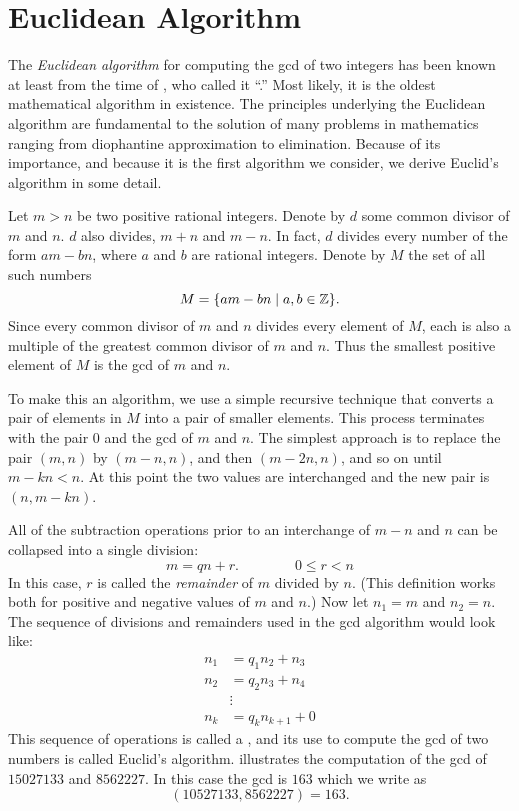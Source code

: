 \section{Euclidean Algorithm}
\label{Integer:Euclidean:Sec}

The {\em Euclidean algorithm} for computing the {\sc gcd} of two
integers has been known at least from the time of 
\cite{Fritz1945-sw}, who called it ``.''  Most
likely, it is the oldest mathematical algorithm in existence.  The
principles underlying the Euclidean algorithm are fundamental to the
solution of many problems in mathematics ranging from diophantine
approximation to elimination.  Because of its importance, and because
it is the first algorithm we consider, we derive Euclid's algorithm in
some detail.

Let $m > n$ be two positive rational integers.  Denote by $d$ some
common divisor of $m$ and $n$.  $d$ also divides, $m+n$ and $m-n$.  In
fact, $d$ divides every number of the form $am - bn$, where $a$ and
$b$ are rational integers.  Denote by $M$ the set of all such numbers
\[
M = \{ am - bn \mid a,b \in \mathbb{Z}\}.
\]
Since every common divisor of $m$ and $n$ divides every element of
$M$, each is also a multiple of the greatest common divisor of $m$ and
$n$.  Thus the smallest positive element of $M$ is the {\sc gcd} of $m$ and
$n$.

To make this an algorithm, we use a simple recursive technique that
converts a pair of elements in $M$ into a pair of smaller elements.
This process terminates with the pair $0$ and the {\sc gcd} of $m$ and
$n$.  The simplest approach is to replace the pair $(m,n)$ by
$(m-n,n)$, and then $(m-2n, n)$, and so on until $m-kn < n$.  At this
point the two values are interchanged and the new pair is $(n, m-kn)$.

All of the subtraction operations prior to an interchange of $m-n$ and
$n$ can be collapsed into a single division:
\begin{equation}
m = q n + r.\qquad\qquad 0 \le r < n 
\label{Remainder:Eq}
\end{equation}
In this case, $r$ is called the {\it remainder} of $m$ divided by $n$.
(This definition works both for positive and negative values of $m$
and $n$.)  Now let $n_1 = m$ and $n_2 = n$.  The sequence of
divisions and remainders used in the {\sc gcd} algorithm would look like:
\begin{equation} \label{Int:RemainderSeq:Eq}
  \begin{aligned}
   n_1 &= q_1 n_2 + n_3\\
   n_2&=q_2 n_3 + n_4\\
     &\vdots\\
   n_k& = q_k n_{k+1} + 0
  \end{aligned}
\end{equation}
This sequence of operations is called a , and
its use to compute the {\sc gcd} of two numbers is called Euclid's
algorithm.   illustrates the computation of
the {\sc gcd} of $15027133$ and $8562227$.  In this case the {\sc
gcd} is $163$ which we write as 
\[
(10527133, 8562227) = 163.
\]


